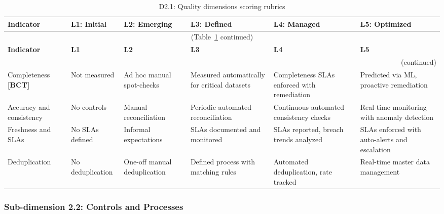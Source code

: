 \begin{center}
{\small
\begin{longtable}{|p{2.4cm}|p{2.0cm}|p{2.0cm}|p{2.2cm}|p{2.2cm}|p{2.2cm}|}
\caption{D2.1: Quality dimensions scoring rubrics} \label{tab:d2-1} \\
\hline
\textbf{Indicator} & \textbf{L1: Initial} & \textbf{L2: Emerging} & \textbf{L3: Defined} & \textbf{L4: Managed} & \textbf{L5: Optimized} \\
\hline
\endfirsthead
\multicolumn{6}{c}{\small (Table~\ref{tab:d2-1} continued)} \\
\hline
\textbf{Indicator} & \textbf{L1} & \textbf{L2} & \textbf{L3} & \textbf{L4} & \textbf{L5} \\
\hline
\endhead
\hline
\multicolumn{6}{r}{\small (continued)} \\
\endfoot
\hline
\endlastfoot
Completeness \textbf{[BCT]} &
  Not measured &
  Ad hoc manual spot-checks &
  Measured automatically for critical datasets &
  Completeness SLAs enforced with remediation &
  Predicted via ML, proactive remediation \\
\hline
Accuracy and consistency &
  No controls &
  Manual reconciliation &
  Periodic automated reconciliation &
  Continuous automated consistency checks &
  Real-time monitoring with anomaly detection \\
\hline
Freshness and SLAs &
  No SLAs defined &
  Informal expectations &
  SLAs documented and monitored &
  SLAs reported, breach trends analyzed &
  SLAs enforced with auto-alerts and escalation \\
\hline
Deduplication &
  No deduplication &
  One-off manual deduplication &
  Defined process with matching rules &
  Automated deduplication, rate tracked &
  Real-time master data management \\
\hline
\end{longtable}
}
\end{center}

\subsubsection*{Sub-dimension 2.2: Controls and Processes}


